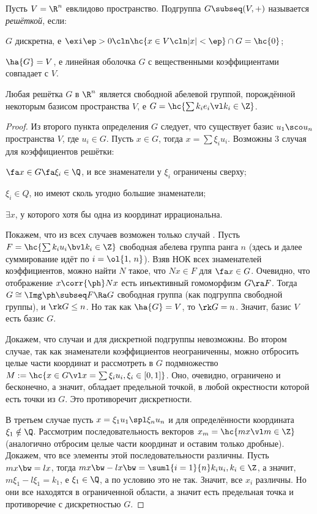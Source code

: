 \documentclass[a4paper]{article}
\begin{document}
\begin{df}
Пусть $V=\R^n$ евклидово пространство. Подгруппа $G \subseq (V, +)$ называется \emph{решёткой}, если:

 $G$ дискретна, е $\exi \ep > 0\cln \hc{x \in V\cln |x| < \ep} \cap G = \hc{0}$;

 $\ha{G}=V$, е линейная оболочка $G$ с вещественными коэффициентами совпадает с $V$.
\end{df}

\begin{theorem}
Любая решётка $G$ в $\R^n$ является свободной абелевой группой, порождённой некоторым базисом  пространства
$V$, е $G = \hc{\sum k_i e_i \vl k_i \in \Z}$.
\end{theorem}
\begin{proof}
Из второго пункта определения $G$ следует, что существует базис $u_1 \sco u_n$ пространства $V$, где $u_i \in G$. Пусть
$x \in G$, тогда $x = \sum \xi_i u_i$. Возможны 3 случая для коэффициентов решётки:

 $\fa x \in G \fa \xi_i \in \Q$, и все знаменатели у $\xi_i$ ограничены сверху;

 $\xi_i \in Q$, но имеют сколь угодно большие знаменатели;

 $\exi x$, у которого хотя бы одна из координат иррациональна.

Покажем, что из всех случаев возможен только случай . Пусть $F = \hc{\sum k_i u_i  \bvl k_i \in \Z}$
свободная абелева группа ранга $n$ (здесь и далее суммирование идёт по $i=\ol{1,\,n}$). Взяв НОК всех знаменателей
коэффициентов, можно найти $N$ такое, что $Nx \in F$ для $\fa x \in G$. Очевидно, что  отображение $x \corr{\ph} Nx$ есть инъективный гомоморфизм $G \ra
F$. Тогда $G \cong \Img \ph \subseq F \Ra G$ свободная группа (как подгруппа свободной группы), и $\rk G
\le n$. Но так как $\ha{G}=V$, то $\rk G = n$. Значит, базис $V$ есть базис $G$.

Докажем, что случаи  и  для дискретной подгруппы невозможны. Во втором случае, так как
знаменатели коэффициентов неограниченны, можно отбросить целые части координат и рассмотреть в $G$
подмножество $M := \hc{x \in G \vl x = \sum \xi_i u_i, \xi_i \in [0,1]}$. Оно, очевидно,
ограничено и бесконечно, а значит, обладает предельной точкой, в любой окрестности которой есть точки из $G$.
Это противоречит дискретности.

В третьем случае пусть $x=\xi_1 u_1 \spl \xi_n u_n$ и для определённости координата $\xi_1 \notin \Q$.
Рассмотрим последовательность  векторов $x_m = \hc{mx \vl m \in \Z}$ (аналогично отбросим целые части
координат и оставим только дробные). Докажем, что все элементы этой последовательности различны. Пусть $mx \bw=lx$,
тогда $mx\bw-lx \bw= \suml{i=1}{n}k_i u_i, k_i \in \Z$, а значит, $m\xi_1 - l\xi_1 = k_1$, е $\xi_1 \in
\Q$, а по условию это не так. Значит, все $x_i$ различны. Но они все находятся в ограниченной области, а
значит есть предельная точка и противоречие с дискретностью $G$.
\end{proof}
\end{document}
